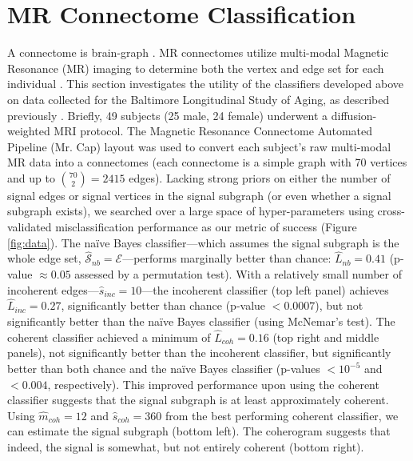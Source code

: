 \documentclass[10pt,journal,cspaper,compsoc]{IEEEtran}
\providecommand{\mc}[1]{\mathcal{#1}}
\providecommand{\wh}[1]{\widehat{#1}}
\providecommand{\mhc}[1]{\widehat{\mathcal{#1}}}
\begin{document}

\section{MR Connectome Classification} %
\label{sub:mr_connectome_classification}

A connectome is brain-graph \cite{Sporns2010}.  MR connectomes utilize multi-modal Magnetic Resonance (MR) imaging to determine both the vertex and edge set for each individual \cite{Hagmann2010}.  This section investigates the utility of the classifiers developed above on data collected for the Baltimore Longitudinal Study of Aging, as described previously \cite{OHBM10}.  Briefly, 49 subjects (25 male, 24 female) underwent a diffusion-weighted MRI protocol. The Magnetic Resonance Connectome Automated Pipeline (Mr. Cap) layout was used to convert each subject's raw multi-modal MR data into a connectomes \cite{MRCAP11} (each connectome is a simple graph with 70 vertices and up to $\binom{70}{2}=2415$ edges). Lacking strong priors on either the number of signal edges or signal vertices in the signal subgraph (or even whether a signal subgraph exists), we searched over a large space of hyper-parameters using cross-validated misclassification performance as our metric of success (Figure \ref{fig:data}).  The na\"ive Bayes classifier---which assumes the signal subgraph is the whole edge set, $\mhc{S}_{nb}=\mc{E}$---performs marginally better than chance: $\wh{L}_{nb}=0.41$ (p-value $\approx 0.05$ assessed by a permutation test).  With a relatively small number of incoherent edges---$\wh{s}_{inc}=10$---the incoherent classifier (top left panel) achieves $\wh{L}_{inc}=0.27$, significantly better than chance (p-value $<0.0007$), but not significantly better than the na\"ive Bayes classifier (using McNemar's test).  The coherent classifier achieved a minimum of $\wh{L}_{coh}=0.16$ (top right and middle panels), not significantly better than the incoherent classifier, but significantly better than both chance and the na\"ive Bayes classifier (p-values $<10^{-5}$ and $<0.004$, respectively).  This improved performance upon using the coherent classifier suggests that the signal subgraph is at least approximately coherent. Using $\wh{m}_{coh}=12$ and $\wh{s}_{coh}=360$ from the best performing coherent classifier, we can estimate the signal subgraph (bottom left).  The coherogram suggests that indeed, the signal is somewhat, but not entirely coherent (bottom right).
\end{document}
